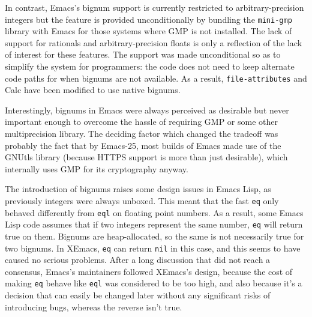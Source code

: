 \documentclass[format=acmsmall, review]{acmart}
\newcommand \Elisp {Emacs Lisp}
\begin{document}
In contrast, Emacs's bignum support is currently restricted to
arbitrary-precision integers but the feature is provided unconditionally by
bundling the \texttt{mini-gmp} library with Emacs for those systems where
GMP is not installed.  The lack of support for rationals and
arbitrary-precision floats is only a reflection of the lack of interest for
these features.  The support was made unconditional so as to simplify the
system for programmers: the code does
not need to keep alternate code paths for when bignums are not available.
As a result, \texttt{file-attributes} and Calc have been modified to use
native bignums.

Interestingly, bignums in Emacs were always perceived as desirable but never
important enough to overcome the hassle of requiring GMP or some other
multiprecision library.  The deciding factor which changed the tradeoff was probably the fact that by Emacs-25, most builds of Emacs made use of the GNUtls
library (because HTTPS support is more than just desirable), which
internally uses GMP for its cryptography anyway.

The introduction of bignums raises some design issues in \Elisp, as
previously integers were always unboxed.  This meant that the fast
\texttt{eq} only behaved differently from \texttt{eql} on floating point
numbers.  As a result, some \Elisp{} code assumes that if two integers
represent the same number, \texttt{eq} will return true on them.
Bignums are heap-allocated, so the same is not necessarily true for two
bignums.  In XEmacs, \texttt{eq} can return \texttt{nil} in this case, and
this seems to have caused no serious problems.  After a long discussion that
did not reach a consensus, Emacs's maintainers followed XEmacs's design,
because the cost of making \texttt{eq} behave like \texttt{eql} was
considered to be too high, and also because it's a decision that can easily
be changed later without any significant risks of introducing bugs, whereas
the reverse isn't true.




\end{document}
